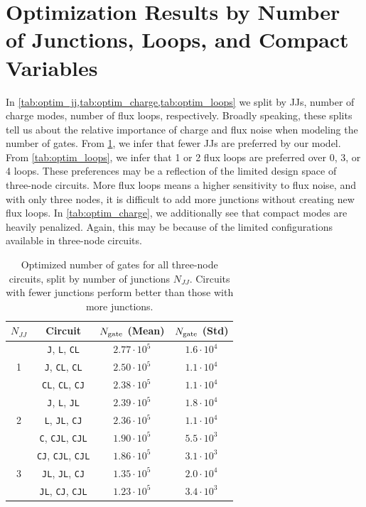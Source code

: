 \section{Optimization Results by Number of Junctions, Loops, and Compact Variables} \label{app:more_optim_results}

In \cref{tab:optim_jj,tab:optim_charge,tab:optim_loops} we split by JJs, number of charge modes, number of flux loops, respectively. Broadly speaking, these splits tell us about the relative importance of charge and flux noise when modeling the number of gates. From \cref{tab:optim_jj}, we infer that fewer JJs are preferred by our model. From \cref{tab:optim_loops}, we infer that 1 or 2 flux loops are preferred over 0, 3, or 4 loops. These preferences may be a reflection of the limited design space of three-node circuits. More flux loops means a higher sensitivity to flux noise, and with only three nodes, it is difficult to add more junctions without creating new flux loops. In \cref{tab:optim_charge}, we additionally see that compact modes are heavily penalized. Again, this may be because of the limited configurations available in three-node circuits.

\begin{table}[htbp]
\setlength{\tabcolsep}{7.5pt}
\centering
\begin{tabular}{cccc}
\toprule
$N_{JJ}$ & Circuit & $N_{\rm gate}$ (Mean) & $N_{\rm gate}$ (Std) \\ \toprule
\multirow{3}{*}{1}& \texttt{J}, \texttt{L}, \texttt{CL} & $2.77\cdot10^{5}$ & $1.6\cdot10^{4}$ \\
& \texttt{J}, \texttt{CL}, \texttt{CL} & $2.50\cdot10^{5}$ & $1.1\cdot10^{4}$ \\
& \texttt{CL}, \texttt{CL}, \texttt{CJ} & $2.38\cdot10^{5}$ & $1.1\cdot10^{4}$ \\
\midrule
\multirow{3}{*}{2}& \texttt{J}, \texttt{L}, \texttt{JL} & $2.39\cdot10^{5}$ & $1.8\cdot10^{4}$ \\
& \texttt{L}, \texttt{JL}, \texttt{CJ} & $2.36\cdot10^{5}$ & $1.1\cdot10^{4}$ \\
& \texttt{C}, \texttt{CJL}, \texttt{CJL} & $1.90\cdot10^{5}$ & $5.5\cdot10^{3}$ \\
\midrule
\multirow{3}{*}{3}& \texttt{CJ}, \texttt{CJL}, \texttt{CJL} & $1.86\cdot10^{5}$ & $3.1\cdot10^{3}$ \\
& \texttt{JL}, \texttt{JL}, \texttt{CJ} & $1.35\cdot10^{5}$ & $2.0\cdot10^{4}$ \\
& \texttt{JL}, \texttt{CJ}, \texttt{CJL} & $1.23\cdot10^{5}$ & $3.4\cdot10^{3}$ \\
\bottomrule
\end{tabular}
    \caption{Optimized number of gates for all three-node circuits, split by number of junctions $N_{JJ}$. Circuits with fewer junctions perform better than those with more junctions.} 
    \label{tab:optim_jj}
\end{table}

